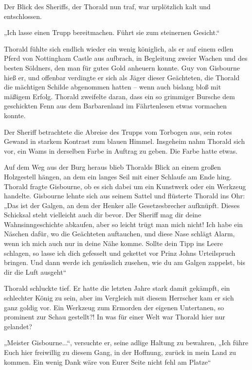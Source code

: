 \documentclass[10pt, a4paper, oneside]{book}
\begin{document}
Der Blick des Sheriffs, der Thorald nun traf, war urplötzlich kalt und entschlossen.

„Ich lasse einen Trupp bereitmachen. Führt sie zum steinernen Gesicht.“\bigskip







Thorald fühlte sich endlich wieder ein wenig königlich, als er auf einem edlen Pferd von Nottingham Castle aus aufbrach, in Begleitung zweier Wachen und des besten Söldners, den man für gutes Gold anheuern konnte. Guy von Gisbourne hieß er, und offenbar verdingte er sich als Jäger dieser Geächteten, die Thorald die mächtigen Schilde abgenommen hatten – wenn auch bislang bloß mit mäßigem Erfolg. Thorald zweifelte daran, dass ein so grimmiger Bursche dem geschickten Fenn aus dem Barbarenland im Fährtenlesen etwas vormachen konnte.

Der Sheriff betrachtete die Abreise des Trupps vom Torbogen aus, sein rotes Gewand in starkem Kontrast zum blauen Himmel. Insgeheim nahm Thorald sich vor, ein Wams in derselben Farbe in Auftrag zu geben. Die Farbe hatte etwas.

Auf dem Weg aus der Burg heraus blieb Thoralds Blick an einem großen Holzgestell hängen, an dem ein langes Seil mit einer Schlaufe am Ende hing. Thorald fragte Gisbourne, ob es sich dabei um ein Kunstwerk oder ein Werkzeug handelte. Gisbourne lehnte sich aus seinem Sattel und flüsterte Thorald ins Ohr: „Das ist der Galgen, an dem der Henker alle Gesetzesbrecher aufknüpft. Dieses Schicksal steht vielleicht auch dir bevor. Der Sheriff mag dir deine Wahnsinngeschichte abkaufen, aber so leicht trügt man mich nicht! Ich habe ein Näschen dafür, wo die Geächteten auftauchen, und diese Nase schlägt Alarm, wenn ich mich auch nur in deine Nähe komme. Sollte dein Tipp ins Leere schlagen, so lasse ich dich gefesselt und gekettet vor Prinz Johns Urteilspruch bringen. Und dann werde ich genüsslich zusehen, wie du am Galgen zappelst, bis dir die Luft ausgeht“

Thorald schluckte tief. Er hatte die letzten Jahre stark damit gekämpft, ein schlechter König zu sein, aber im Vergleich mit diesem Herrscher kam er sich ganz goldig vor. Ein Werkzeug zum Ermorden der eigenen Untertanen, so prominent zur Schau gestellt?! In was für einer Welt war Thorald hier nur gelandet?

„Meister Gisbourne...“, versuchte er, seine adlige Haltung zu bewahren, „Ich führe Euch hier freiwillig zu diesem Gang, in der Hoffnung, zurück in mein Land zu kommen. Ein wenig Dank wäre von Eurer Seite nicht fehl am Platze“
\end{document}
